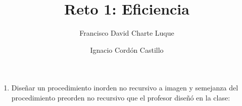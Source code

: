 \documentclass[a4paper,10pt]{scrartcl}
\title{Reto 1: Eficiencia}
\author{Francisco David Charte Luque\and
        Ignacio Cordón Castillo}
\date{}
\begin{document}
\maketitle
\begin{enumerate}

 \item Diseñar un procedimiento inorden no recursivo a imagen y semejanza
 del procedimiento preorden no recursivo que el profesor diseñó en la clase:
 
 \leftskip=1cm
 \begin{verbatim}
 
 \end{verbatim}
\end{enumerate}
\end{document}
